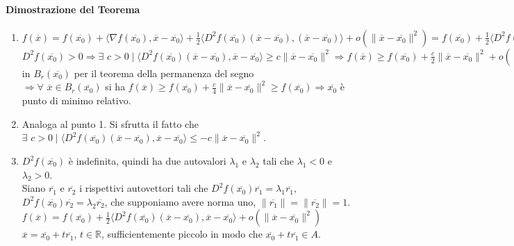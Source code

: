 \documentclass{article}
\newcommand{\R}{\mathbb{R}}
\begin{document}
\paragraph{{Dimostrazione del Teorema}}
\begin{enumerate}
    \item $f(\overline{x})=f(\overline{x_0})+\langle \nabla f(\overline{x_0}), \overline{x}-\overline{x_0} \rangle+\frac{1}{2}\langle D^2f(\overline{x_0})(\overline{x}-\overline{x_0}),(\overline{x}-\overline{x_0}) \rangle+o(\| \overline{x}-\overline{x_0} \|^2)=f(\overline{x_0})+\frac{1}{2}\langle D^2f(\overline{x_0})(\overline{x}-\overline{x_0}),(\overline{x}-\overline{x_0})\rangle+o(\|\overline{x}-\overline{x_0}\|^2)$\\
    $D^2f(\overline{x_0})>0 \Rightarrow \exists \,\, c >0 \mid \langle D^2f(\overline{x_0})(\overline{x}-\overline{x_0}),\overline{x}-\overline{x_0} \rangle \geq c\|\overline{x}-\overline{x_0} \|^2\Rightarrow f(\overline{x})\geq f(\overline{x_0})+\frac{c}{2}\|\overline{x}-\overline{x_0}\|^2+o(\|\overline{x}-\overline{x_0}\|^2)=-f(\overline{x_0})+\|\overline{x}-\overline{x_0} \|^2(\frac{c}{2}+o(1))\Rightarrow \exists\,\, r>0 \mid \frac{c}{2}+o(1)\geq \frac{c}{4}$in $B_r(\overline{x_0})$ per il teorema della permanenza del segno\\
    $\Rightarrow \forall\,\, \overline{x}\in B_r(\overline{x_0})$ si ha
    $f(\overline{x})\geq f(\overline{x_0})+\frac{c}{4}\|\overline{x}-\overline{x_0}\|^2 \geq f(\overline{x_0}) \Rightarrow \overline{x_0}$ è punto di minimo relativo.
    \item Analoga al punto 1. Si sfrutta il fatto che $\exists \,\, c>0 \mid \langle D^2f(\overline{x_0})(\overline{x}-\overline{x_0}),\overline{x}-\overline{x_0} \rangle \leq -c\|\overline{x}-\overline{x_0}\|^2$.
    \item $D^2f(\overline{x_0})$ è indefinita, quindi ha due autovalori $\lambda_1$ e $\lambda_2$ tali che $\lambda_1<0$ e $\lambda_2>0$.\\
    Siano $\overline{r_1}$ e $\overline{r_2}$ i rispettivi autovettori tali che $D^2f(\overline{x_0})\overline{r_1}=\lambda_1\overline{r_1}$, $D^2f(\overline{x_0})\overline{r_2}=\lambda_2\overline{r_2}$, che supponiamo avere norma uno, $\|\overline{r_1} \|=\|\overline{r_2}\|=1$.\\
    $f(\overline{x})=f(\overline{x_0})+\frac{1}{2}\langle D^2f(\overline{x_0})(\overline{x}-\overline{x_0}),\overline{x}-\overline{x_0} \rangle + o(\|\overline{x}-\overline{x_0}\|^2)$\\
    $\overline{x}=\overline{x_0}+t\overline{r_1}$, $t \in \R$, sufficientemente piccolo in modo che $\overline{x_0}+t\overline{r_1}\in A$.\\

\end{enumerate}
\end{document}
